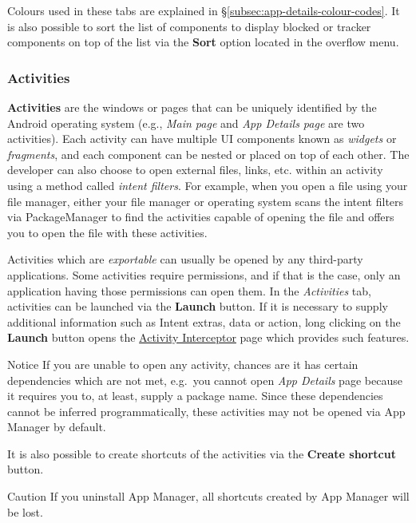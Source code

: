 Colours used in these tabs are explained in §\ref{subsec:app-details-colour-codes}. It is also possible to sort the list
of components to display blocked or tracker components on top of the list via the \textbf{Sort} option located in the
overflow menu.

\subsubsection{Activities}\label{subsubsec:activities} %
\textbf{Activities} are the windows or pages that can be uniquely identified by the Android operating system (e.g.,
\textit{Main page} and \textit{App Details page} are two activities). Each activity can have multiple UI components
known as \textit{widgets} or \textit{fragments}, and each component can be nested or placed on top of each other. The
developer can also choose to open external files, links, etc. within an activity using a method called
\textit{intent filters}. For example, when you open a file using your file manager, either your file manager or
operating system scans the intent filters via PackageManager to find the activities capable of opening the file and
offers you to open the file with these activities.

Activities which are \textit{exportable} can usually be opened by any third-party applications. Some activities require
permissions, and if that is the case, only an application having those permissions can open them. In the
\textit{Activities} tab, activities can be launched via the \textbf{Launch} button. If it is necessary to supply
additional information such as Intent extras, data or action, long clicking on the \textbf{Launch} button opens the
\hyperref[sec:interceptor-page]{Activity Interceptor} page which provides such features.

\begin{tip}{Notice}
    If you are unable to open any activity, chances are it has certain dependencies which are not met, e.g.\ you
    cannot open \textit{App Details} page because it requires you to, at least, supply a package name. Since these
    dependencies cannot be inferred programmatically, these activities may not be opened via App Manager by default.
\end{tip}

It is also possible to create shortcuts of the activities via the \textbf{Create shortcut} button.

\begin{danger}{Caution}
    If you uninstall App Manager, all shortcuts created by App Manager will be lost.
\end{danger}

